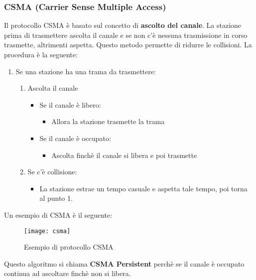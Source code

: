 \documentclass[a4paper]{article}
\begin{document}
\subsubsection{CSMA (Carrier Sense Multiple Access)}
Il protocollo CSMA è basato sul concetto di \textbf{ascolto del canale}. La stazione
prima di trasmettere ascolta il canale e se non c'è nessuna trasmissione in corso
trasmette, altrimenti aspetta. Questo metodo permette di ridurre le collisioni.
La procedura è la seguente:
\begin{enumerate}
  \item Se una stazione ha una trama da trasmettere:
    \begin{enumerate}
      \item \label{csma-1a}Ascolta il canale
        \begin{itemize}
          \item Se il canale è libero:
            \begin{itemize}
              \item Allora la stazione trasmette la trama
            \end{itemize}

          \item Se il canale è occupato:
            \begin{itemize}
              \item Ascolta finchè il canale si libera e poi trasmette
            \end{itemize}
        \end{itemize}

      \item \label{csma-1b}Se c'è collisione:
        \begin{itemize}
          \item La stazione estrae un tempo casuale e aspetta tale tempo, poi torna
            al punto 1.
        \end{itemize}
    \end{enumerate}
\end{enumerate}

\begin{example}
  Un esempio di CSMA è il seguente:
  \begin{figure}[H]
    \centering
    \texttt{[image: csma]}
    \caption{Esempio di protocollo CSMA}
  \end{figure}
\end{example}
Questo algoritmo si chiama \textbf{CSMA Persistent} perchè se il canale è occupato
continua ad ascoltare finchè non si libera.
\end{document}
